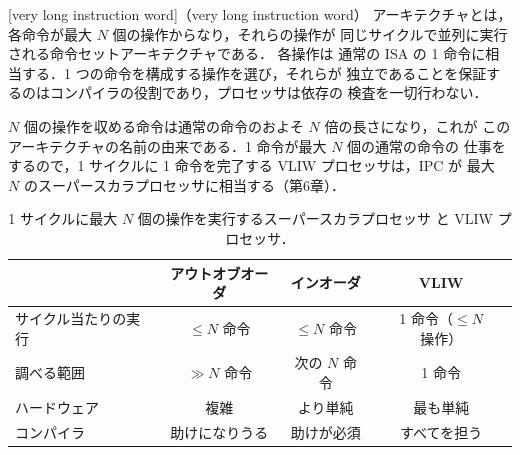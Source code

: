 \documentclass[../main.tex]{subfiles}
\begin{document}
\begin{definition}[VLIW]
  \label{def:l11-vliw}
  [very long instruction word]（very long instruction word）
  アーキテクチャとは，各命令が最大 $N$ 個の操作からなり，それらの操作が
  同じサイクルで並列に実行される命令セットアーキテクチャである．%
  各操作は
  通常の ISA の 1 命令に相当する．1 つの命令を構成する操作を選び，それらが
  独立であることを保証するのはコンパイラの役割であり，プロセッサは依存の
  検査を一切行わない．
\end{definition}

$N$ 個の操作を収める命令は通常の命令のおよそ $N$ 倍の長さになり，これが
このアーキテクチャの名前の由来である．1 命令が最大 $N$ 個の通常の命令の
仕事をするので，1 サイクルに 1 命令を完了する VLIW プロセッサは，IPC が
最大~$N$ のスーパースカラプロセッサに相当する（第6章）．

\begin{table}[htbp]
  \centering\small
  \caption{1 サイクルに最大 $N$ 個の操作を実行するスーパースカラプロセッサ
    と VLIW プロセッサ．}
  \label{tab:l11-compare}
  \begin{tabular}{@{}lccc@{}}
    \toprule
                         & アウトオブオーダ  & インオーダ      & VLIW \\
    \midrule
    サイクル当たりの実行 & $\le N$ 命令      & $\le N$ 命令    & 1 命令（$\le N$ 操作） \\
    調べる範囲           & $\gg N$ 命令      & 次の $N$ 命令   & 1 命令 \\
    ハードウェア         & 複雑              & より単純        & 最も単純 \\
    コンパイラ           & 助けになりうる    & 助けが必須      & すべてを担う \\
    \bottomrule
  \end{tabular}
\end{table}
\end{document}
